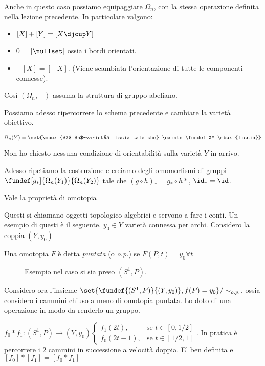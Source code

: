 \begin{oss}
 Anche in questo caso possiamo equipaggiare $\Omega _n$, con la stessa operazione definita nella lezione precedente.
 In particolare valgono:
 \begin{itemize}
  \item $\left [ X \right ] + \left [ Y \right ] = \left [ X \djcup Y \right ]$
  \item 0 = $\left [ \nullset \right ]$ ossia i bordi orientati.
  \item $-\left[ X\right]=\left[-X\right]$. (Viene scambiata l'orientazione di tutte le componenti connesse).
 \end{itemize}
 Così $(\Omega _n, +)$ assuma la struttura di gruppo abeliano.
\end{oss}
Possiamo adesso ripercorrere lo schema precedente e cambiare la varietà obiettivo.
\begin{defn}
 $\Omega_n (Y) = \set{\mbox{$X$ $n$-varietà liscia tale che} \exists \fundef XY \mbox{liscia}}$
\end{defn}
\begin{oss}
 Non ho chiesto nessuna condizione di orientabilità sulla varietà $Y$ in arrivo.
\end{oss}
Adesso ripetiamo la costruzione e creiamo degli omomorfismi di gruppi $\fundef[g_*]{\Omega _n (Y_1)}{\Omega _n(Y_2)}$ tale che $(g\circ h )_* = g_*\circ h*$,
 $\id_* = \id$.
\begin{teo}
 Vale la proprietà di omotopia
\end{teo}
Questi si chiamano oggetti topologico-algebrici e servono a fare i conti. Un esempio di questi è il seguente.
$y_0\in Y$ varietà connessa per archi. Considero la coppia $(Y, y_0)$
\begin{defn}
Una omotopia $F$ è detta \emph{puntata} (o \emph{o.p.}) se $F(P, t) = y_0 \forall t$
 \begin{figure}
  \centering
  
  \caption{Esempio nel caso si sia preso $(S^1, P).$}
 \end{figure}

\end{defn}
Considero ora l'insieme $\set{\fundef {(S^1, P)}{(Y, y_0)}, f(P) = y_0}/\sim_{o.p.}$, ossia considero i cammini chiuso a meno di omotopia puntata.
Lo doto di una operazione in modo da renderlo un gruppo.
\begin{defn}
 $f_0 * f_1:(S^1, P)\rightarrow (Y, y_0)\begin{cases} f_1(2t), & \mbox{se } t\in \left [0, 1/2\right ] \\ f_0(2t-1), & \mbox{se }t\in \left [1/2, 1\right ]\end{cases}$.
 In pratica è percorrere i 2 cammini in successione a velocità doppia.
 E' ben definita e $\left [ f_0 \right] *\left [ f_1 \right] = \left [ f_0 * f_1 \right]$
\end{defn}
